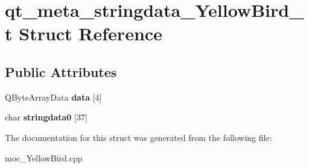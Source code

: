 \hypertarget{structqt__meta__stringdata__YellowBird__t}{}\section{qt\+\_\+meta\+\_\+stringdata\+\_\+\+Yellow\+Bird\+\_\+t Struct Reference}
\label{structqt__meta__stringdata__YellowBird__t}
\subsection*{Public Attributes}
\begin{DoxyCompactItemize}
\item 
Q\+Byte\+Array\+Data {\bfseries data} \mbox{[}4\mbox{]}\hypertarget{structqt__meta__stringdata__YellowBird__t_ae6e5b7c4b806965991112e2f077f03af}{}\label{structqt__meta__stringdata__YellowBird__t_ae6e5b7c4b806965991112e2f077f03af}

\item 
char {\bfseries stringdata0} \mbox{[}37\mbox{]}\hypertarget{structqt__meta__stringdata__YellowBird__t_a9e2466a22319de37ffab57dc28a6a044}{}\label{structqt__meta__stringdata__YellowBird__t_a9e2466a22319de37ffab57dc28a6a044}

\end{DoxyCompactItemize}


The documentation for this struct was generated from the following file\+:\begin{DoxyCompactItemize}
\item 
moc\+\_\+\+Yellow\+Bird.\+cpp\end{DoxyCompactItemize}
